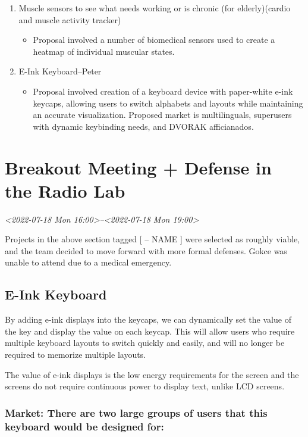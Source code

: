 \documentclass[11pt]{article}
\begin{document}
\begin{enumerate}
\begin{itemize}
\end{itemize}
\item Muscle sensors to see what needs working or is chronic (for elderly)(cardio and muscle activity tracker)
\begin{itemize}
\item Proposal involved a number of biomedical sensors used to create a heatmap of individual muscular states.
\end{itemize}
\item E-Ink Keyboard–Peter
\begin{itemize}
\item Proposal involved creation of a keyboard device with paper-white e-ink keycaps, allowing users to switch alphabets and layouts while maintaining an accurate visualization. Proposed market is multilinguals, superusers with dynamic keybinding needs, and DVORAK afficianados.
\end{itemize}
\end{enumerate}

\section{Breakout Meeting + Defense in the Radio Lab}
\label{sec:org8f7228b}
\textit{<2022-07-18 Mon 16:00>--<2022-07-18 Mon 19:00>}

Projects in the above section tagged [ -- NAME ] were selected as roughly viable, and the team decided to move forward with more formal defenses. Gokce was unable to attend due to a medical emergency.

\subsection{E-Ink Keyboard}
\label{sec:orge92ba40}

By adding e-ink displays into the keycaps, we can dynamically set the value of the key and display the value on each keycap.  This will allow users who require multiple keyboard layouts to switch quickly and easily, and will no longer be required to memorize multiple layouts.

The value of e-ink displays is the low energy requirements for the screen and the screens do not require continuous power to display text, unlike LCD screens.

\subsubsection{Market: There are two large groups of users that this keyboard would be designed for:}
\label{sec:org273fa4b}
\end{document}
